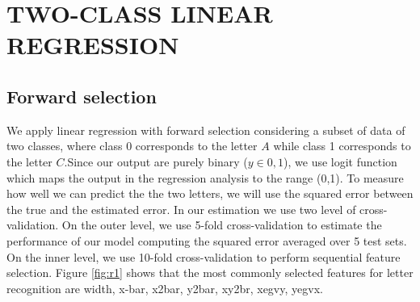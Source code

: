 \section{TWO-CLASS LINEAR REGRESSION}
\setcounter{section}{2}
\subsection{Forward selection}

We apply linear regression with forward selection considering a subset of data of two classes, where class 0 corresponds to the letter $A$ while class 1 corresponds to the letter $C$.Since our output are purely binary ($y \in {0,1}$), we use logit function which maps the output in the regression analysis to the range (0,1). To measure how well we can predict the the two letters, we will use the squared error between the true and the estimated error. In our estimation we  use two level of cross-validation. On the outer level, we use 5-fold cross-validation  to estimate the performance of our model computing the squared error averaged over 5 test sets. On the inner level, we use 10-fold cross-validation to perform sequential feature selection. Figure \ref{fig:r1} shows that the most commonly selected features for letter recognition are width, x-bar, x2bar, y2bar, xy2br, xegvy, yegvx.


